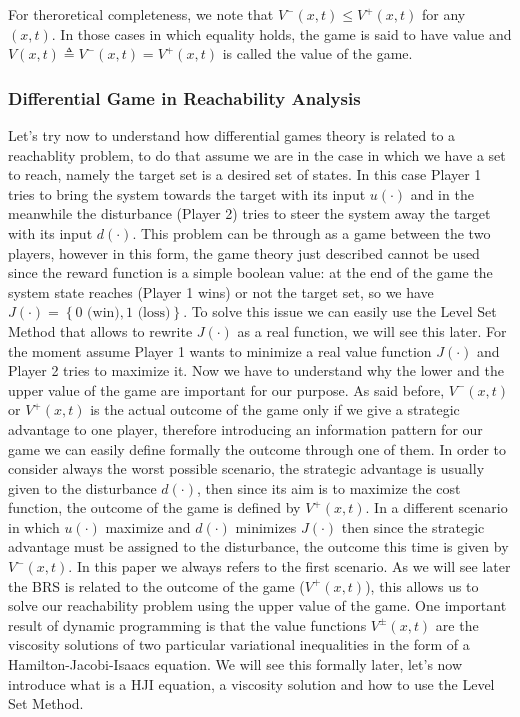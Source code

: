 For theroretical completeness, we note that $V^-(x,t) \leq V^+(x,t)$ for any $(x,t)$. In those cases in which equality holds, the game is said to have value and $V(x,t)\triangleq V^-(x,t) = V^+(x,t)$ is called the value of the game. \cite{new_paper} \newline

\subsubsection{Differential Game in Reachability Analysis}
Let's try now to understand how differential games theory is related to a reachablity problem, to do that assume we are in the case in which we have a set to reach, namely the target set is a desired set of states. In this case Player 1 tries to bring the system towards the target with its input $u(\cdot)$ and in the meanwhile the disturbance (Player 2) tries to steer the system away the target with its input $d(\cdot)$. This problem can be through as a game between the two players, however in this form, the game theory just described cannot be used since the reward function is a simple boolean value: at the end of the game the system state reaches (Player 1 wins) or not the target set, so we have $J(\cdot)=\left\{0 \textrm{ (win)},1\textrm{ (loss)}\right\}$. To solve this issue we can easily use the Level Set Method that allows to rewrite $J(\cdot)$ as a real function, we will see this later. For the moment assume Player 1 wants to minimize a real value function $J(\cdot)$ and Player 2 tries to maximize it. 
Now we have to understand why the lower and the upper value of the game are important for our purpose. As said before, $V^-(x,t)$ or $V^+(x,t)$ is the actual outcome of the game only if we give a strategic advantage to one player, therefore introducing an information pattern for our game we can easily define formally the outcome through one of them. In order to consider always the worst possible scenario, the strategic advantage is usually given to the disturbance $d(\cdot)$, then since its aim is to maximize the cost function, the outcome of the game is defined by $V^+(x,t)$.
In a different scenario in which $u(\cdot)$ maximize and $d(\cdot)$ minimizes $J(\cdot)$ then since the strategic advantage must be assigned to the disturbance, the outcome this time is given by $V^-(x,t)$. In this paper we always refers to the first scenario. 
As we will see later the BRS is related to the outcome of the game ($V^+(x,t)$), this allows us to solve our reachability problem using the upper value of the game. 
One important result of dynamic programming is that the value functions $V^\pm(x,t)$ are the viscosity solutions of two particular variational inequalities in the form of a Hamilton-Jacobi-Isaacs equation. We will see this formally later, let's now introduce what is a HJI equation, a viscosity solution and how to use the Level Set Method.

